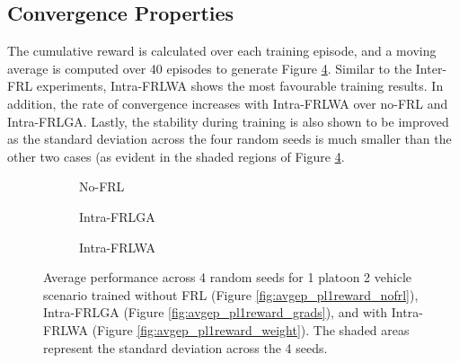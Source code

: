  \subsection{Convergence Properties}

The cumulative reward is calculated over each training episode, and a moving average is
computed over 40 episodes to generate Figure \ref{fig:intra-convergence}.  Similar to the
Inter-FRL experiments, Intra-FRLWA shows the most favourable training results.  In addition,
the rate of convergence increases with Intra-FRLWA over no-FRL and Intra-FRLGA.  Lastly,
the stability during training is also shown to be improved as the standard deviation
across the four random seeds is much smaller than the other two cases (as evident in
the shaded regions of Figure \ref{fig:intra-convergence}.
\begin{figure}[H]
\centering
    \begin{subfigure}{\interfrlRewWidth\textwidth}
        \raggedleft
        
       \caption{No-FRL}\label{fig:intra_avgep_pl1reward_nofrl}
    \end{subfigure}\hspace{\interfrlRewSpace}
    \begin{subfigure}{\interfrlRewWidth\textwidth}
        \raggedleft
        
       \caption{Intra-FRLGA}\label{fig:intra_avgep_pl1reward_grads}
    \end{subfigure}\hspace{\interfrlRewSpace}
        \begin{subfigure}{\interfrlRewWidth\textwidth}
        \raggedleft
        
       \caption{Intra-FRLWA}\label{fig:intra_avgep_pl1reward_weight}
    \end{subfigure}
\caption{Average performance across 4 random seeds for 1 platoon 2 vehicle scenario trained without FRL (Figure \ref{fig:avgep_pl1reward_nofrl}), Intra-FRLGA (Figure \ref{fig:avgep_pl1reward_grads}), and with Intra-FRLWA (Figure \ref{fig:avgep_pl1reward_weight}). The shaded areas represent the standard deviation across the 4 seeds.}
\label{fig:intra-convergence}
\end{figure}

